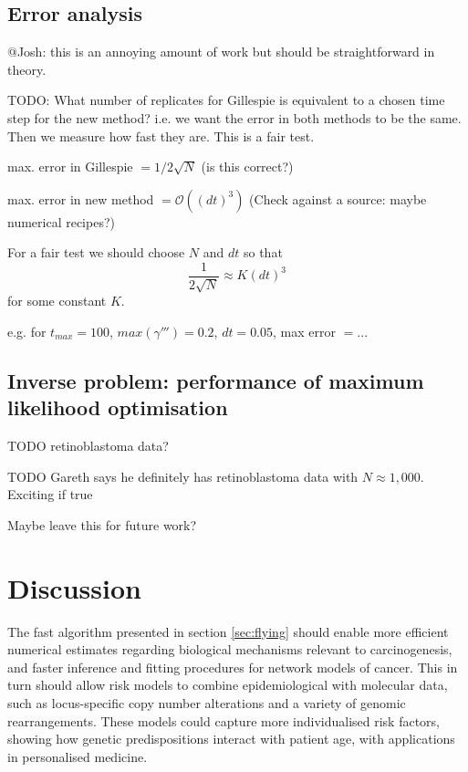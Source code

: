 \documentclass{article}
\begin{document}
\subsection*{Error analysis}

@Josh: this is an annoying amount of work but should be straightforward in
theory.

TODO: What number of replicates for Gillespie is equivalent to a chosen
time step for the new method? i.e. we want the error in both methods to be the
same. Then we measure how fast they are. This is a fair test.

max. error in Gillespie $= 1 / 2 \sqrt{N}$ (is this correct?)

max. error in new method $= \mathcal{O}((dt)^3)$ (Check against a source:
maybe numerical recipes?)

For a fair test we should choose $N$ and $dt$ so that
\begin{equation}
    \frac{1}{2\sqrt{N}} \approx K (dt)^3
\end{equation}
for some constant $K$.

e.g. for $t_{max} = 100$, $max(\gamma''') = 0.2$, $dt = 0.05$, max error $ = ...$


\subsection{Inverse problem: performance of maximum likelihood optimisation}

TODO retinoblastoma data?

TODO Gareth says he definitely has retinoblastoma data with $N\approx1,000$.
Exciting if true

Maybe leave this for future work?

\section{Discussion}


The fast algorithm presented in section \ref{sec:flying} should enable more efficient numerical
estimates regarding biological mechanisms relevant to carcinogenesis, and faster
inference and fitting procedures for network models of cancer. This in turn
should allow risk models to combine epidemiological with molecular data, such as locus-specific copy number
alterations and a variety of genomic rearrangements. These models could
capture more individualised risk factors, showing how genetic predispositions interact
with patient age, with applications in personalised medicine.
\end{document}
